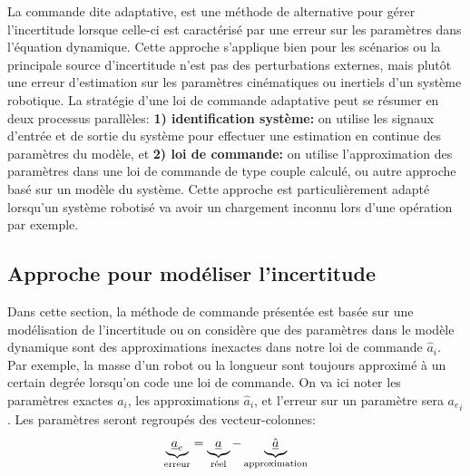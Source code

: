 La commande dite adaptative, est une méthode de alternative pour gérer l'incertitude lorsque celle-ci est caractérisé par une erreur sur les paramètres dans l'équation dynamique. Cette approche s'applique bien pour les scénarios ou la principale source d'incertitude n'est pas des perturbations externes, mais plutôt une erreur d'estimation sur les paramètres cinématiques ou inertiels d'un système robotique. La stratégie d'une loi de commande adaptative peut se résumer en deux processus parallèles: \textbf{1) identification système:} on utilise les signaux d'entrée et de sortie du système pour effectuer une estimation en continue des paramètres du modèle, et \textbf{2) loi de commande: }on utilise l'approximation des paramètres dans une loi de commande de type couple calculé, ou autre approche basé sur un modèle du système. Cette approche est particulièrement adapté lorsqu'un système robotisé va avoir un chargement inconnu lors d'une opération par exemple. 




\subsection{Approche pour modéliser l'incertitude}

Dans cette section, la méthode de commande présentée est basée sur une modélisation de l'incertitude ou on considère que des paramètres dans le modèle dynamique sont des approximations inexactes dans notre loi de commande $\hat{a}_i$. Par exemple, la masse d'un robot ou la longueur sont toujours approximé à un certain degrée lorsqu'on code une loi de commande. On va ici noter les paramètres exactes $a_i$, les approximations $\hat{a}_i$, et l'erreur sur un paramètre sera ${a_e}_i$. Les paramètres seront regroupés des vecteur-colonnes:
\begin{align}
\underbrace{
\underline{a}_e 
}_{\text{erreur}}
= 
\underbrace{
\underline{a}
}_{\text{réel}}
- 
\underbrace{
\underline{\hat{a}}
}_{\text{approximation}}
\end{align}

